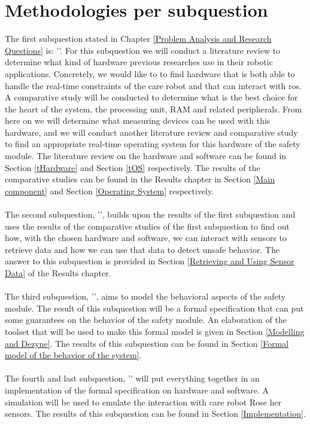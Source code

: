 \documentclass[12pt]{scrreprt}
\begin{document}
\section{Methodologies per subquestion}
\label{Methodologies per subquestion}
The first subquestion stated in Chapter \ref{Problem Analysis and Research Questions} is: '\sqone'. For this subquestion we will conduct a literature review to determine what kind of hardware previous researches use in their robotic applications. Concretely, we would like to to find hardware that is both able to handle the real-time constraints of the care robot and that can interact with \acrshort{ros}. A comparative study will be conducted to determine what is the best choice for the heart of the system, the processing unit, RAM and related peripherals. From here on we will determine what measuring devices can be used with this hardware, and we will conduct another literature review and comparative study to find an appropriate real-time operating system for this hardware of the safety module. The literature review on the hardware and software can be found in Section \ref{tHardware} and Section \ref{tOS} respectively. The results of the comparative studies can be found in the Results chapter in Section \ref{Main component} and Section \ref{Operating System} respectively.
\\\\
The second subquestion, '\sqtwo', builds upon the results of the first subquestion and uses the results of the comparative studies of the first subquestion to find out how, with the chosen hardware and software, we can interact with sensors to retrieve data and how we can use that data to detect unsafe behavior. The answer to this subquestion is provided in Section \ref{Retrieving and Using Sensor Data} of the Results chapter.
\\\\
The third subquestion, '\sqthree', aims to model the behavioral aspects of the safety module. The result of this subquestion will be a formal specification that can put some guarantees on the behavior of the safety module. An elaboration of the toolset that will be used to make this formal model is given in Section \ref{Modelling and Dezyne}. The results of this subquestion can be found in Section \ref{Formal model of the behavior of the system}.
\\\\
The fourth and last subquestion, '\sqfour' will put everything together in an implementation of the formal specification on hardware and software. A simulation will be used to emulate the interaction with care robot Rose her sensors. The results of this subquestion can be found in Section \ref{Implementation}.
\end{document}
